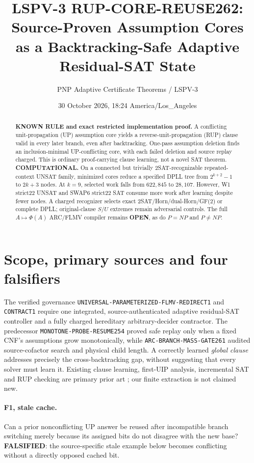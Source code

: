 \documentclass[10pt]{article}
\title{LSPV-3 RUP-CORE-REUSE262: Source-Proven Assumption Cores\\ as a Backtracking-Safe Adaptive Residual-SAT State}
\author{PNP Adaptive Certificate Theorems / LSPV-3}
\date{30 October 2026, 18:24 America/Los\_Angeles}
\newcommand{\OPEN}{\textbf{OPEN}}
\begin{document}
\maketitle
\begin{abstract}
\textbf{KNOWN RULE and exact restricted implementation proof.} A conflicting
unit-propagation (UP) assumption core yields a reverse-unit-propagation
(RUP) clause valid in every later branch, even after backtracking. One-pass
assumption deletion finds an inclusion-minimal UP-conflicting core, with each
failed deletion and source replay charged. This is ordinary proof-carrying
clause learning, not a novel SAT theorem. \textbf{COMPUTATIONAL.} On a connected
but trivially 2SAT-recognizable repeated-context UNSAT family, minimized cores
reduce a specified DPLL tree from $2^{k+2}-1$ to $2k+3$ nodes. At $k=9$,
selected work falls from $622{,}845$ to $28{,}107$. However, W1 strict22 UNSAT
and SWAP6 strict22 SAT consume more work after learning despite fewer nodes.
A charged recognizer selects exact 2SAT/Horn/dual-Horn/GF(2) or complete DPLL;
original-clause $S/U$ extremes remain adversarial controls. The full
$A\mapsto\Phi(A)$ ARC/FLMV compiler remains \OPEN, as do $P=NP$ and $P\ne NP$.
\end{abstract}

\section{Scope, primary sources and four falsifiers}
The verified governance \texttt{UNIVERSAL-PARAMETERIZED-FLMV-REDIRECT1}
and \texttt{CONTRACT1} require one integrated, source-authenticated adaptive
residual-SAT controller and a fully charged hereditary arbitrary-decider
contractor. The predecessor \texttt{MONOTONE-PROBE-RESUME254} proved safe replay
only when a fixed CNF's assumptions grow monotonically, while
\texttt{ARC-BRANCH-MASS-GATE261} audited source-cofactor search and physical
child length. A correctly learned \emph{global clause} addresses precisely the
cross-backtracking gap, without suggesting that every solver must learn it.
Existing clause learning, first-UIP analysis, incremental SAT and RUP checking
are primary prior art \cite{een2003,wetzler2014}; our finite extraction is
not claimed new.

\paragraph{F1, stale cache.} Can a prior nonconflicting UP answer be reused after
incompatible branch switching merely because its assigned bits do not disagree
with the new base? \textbf{FALSIFIED}: the source-specific stale example below
becomes conflicting without a directly opposed cached bit.
\end{document}
